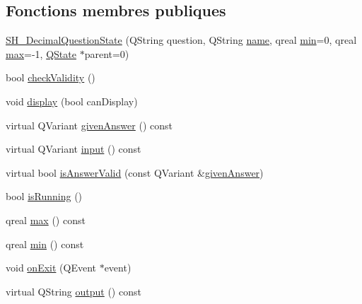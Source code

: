 \subsection*{Fonctions membres publiques}
\begin{DoxyCompactItemize}
\item 
\hyperlink{classSimpleHotel_1_1SH__DecimalQuestionState_a5f875a572b747bde71b72343e1e5d101}{S\-H\-\_\-\-Decimal\-Question\-State} (Q\-String question, Q\-String \hyperlink{classSimpleHotel_1_1SH__NamedObject_ad144716345034c91cface8f3163a799e}{name}, qreal \hyperlink{classSimpleHotel_1_1SH__DecimalQuestionState_a16a881ee4e99b6a02a07cff533c9c82c}{min}=0, qreal \hyperlink{classSimpleHotel_1_1SH__DecimalQuestionState_af97491a4d3adbc9bee96c4cc8aefeb99}{max}=-\/1, \hyperlink{classQState}{Q\-State} $\ast$parent=0)
\item 
bool \hyperlink{classSimpleHotel_1_1SH__QuestionState_a0fd7e76443cfd6f0329b085358e30355}{check\-Validity} ()
\item 
void \hyperlink{classSimpleHotel_1_1SH__InOutState_a1cbe5befe4f42e0941165498ed0117a9}{display} (bool can\-Display)
\item 
virtual Q\-Variant \hyperlink{classSimpleHotel_1_1SH__QuestionState_a243f09bc1f822af7748edb038ac2957c}{given\-Answer} () const 
\item 
virtual Q\-Variant \hyperlink{classSimpleHotel_1_1SH__InOutState_a487d2ca6200fed372b1a27cfa27774db}{input} () const 
\item 
virtual bool \hyperlink{classSimpleHotel_1_1SH__DecimalQuestionState_a1693d6f6026fcc17866c9c90e235bd64}{is\-Answer\-Valid} (const Q\-Variant \&\hyperlink{classSimpleHotel_1_1SH__QuestionState_a243f09bc1f822af7748edb038ac2957c}{given\-Answer})
\item 
bool \hyperlink{classSimpleHotel_1_1SH__GenericState_a5151ff071129bdd4dcf7c60cb93794da}{is\-Running} ()
\item 
qreal \hyperlink{classSimpleHotel_1_1SH__DecimalQuestionState_af97491a4d3adbc9bee96c4cc8aefeb99}{max} () const 
\item 
qreal \hyperlink{classSimpleHotel_1_1SH__DecimalQuestionState_a16a881ee4e99b6a02a07cff533c9c82c}{min} () const 
\item 
void \hyperlink{classSimpleHotel_1_1SH__InOutState_aa5fc1b9281087bd8abcd6873d2a36009}{on\-Exit} (Q\-Event $\ast$event)
\item 
virtual Q\-String \hyperlink{classSimpleHotel_1_1SH__InOutState_a71b15e4d49b9c2aa540500065ceb39da}{output} () const 
\item 

\end{DoxyCompactItemize}
